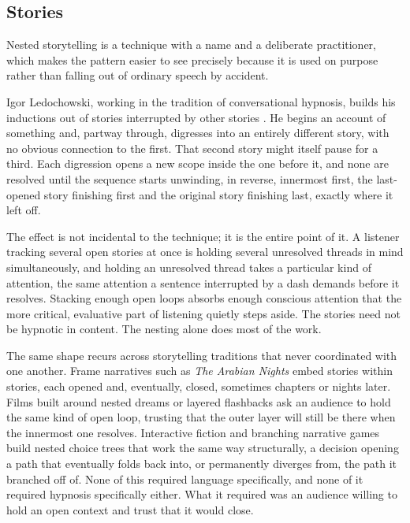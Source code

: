 \documentclass[11pt]{article}
\begin{document}
\subsection{Stories}

Nested storytelling is a technique with a name and a deliberate practitioner, which makes the pattern easier to see precisely because it is used on purpose rather than falling out of ordinary speech by accident.

Igor Ledochowski, working in the tradition of conversational hypnosis, builds his inductions out of stories interrupted by other stories \cite{ledochowski}. He begins an account of something and, partway through, digresses into an entirely different story, with no obvious connection to the first. That second story might itself pause for a third. Each digression opens a new scope inside the one before it, and none are resolved until the sequence starts unwinding, in reverse, innermost first, the last-opened story finishing first and the original story finishing last, exactly where it left off.

The effect is not incidental to the technique; it is the entire point of it. A listener tracking several open stories at once is holding several unresolved threads in mind simultaneously, and holding an unresolved thread takes a particular kind of attention, the same attention a sentence interrupted by a dash demands before it resolves. Stacking enough open loops absorbs enough conscious attention that the more critical, evaluative part of listening quietly steps aside. The stories need not be hypnotic in content. The nesting alone does most of the work.

The same shape recurs across storytelling traditions that never coordinated with one another. Frame narratives such as \emph{The Arabian Nights} embed stories within stories, each opened and, eventually, closed, sometimes chapters or nights later. Films built around nested dreams or layered flashbacks ask an audience to hold the same kind of open loop, trusting that the outer layer will still be there when the innermost one resolves. Interactive fiction and branching narrative games build nested choice trees that work the same way structurally, a decision opening a path that eventually folds back into, or permanently diverges from, the path it branched off of. None of this required language specifically, and none of it required hypnosis specifically either. What it required was an audience willing to hold an open context and trust that it would close.
\end{document}
